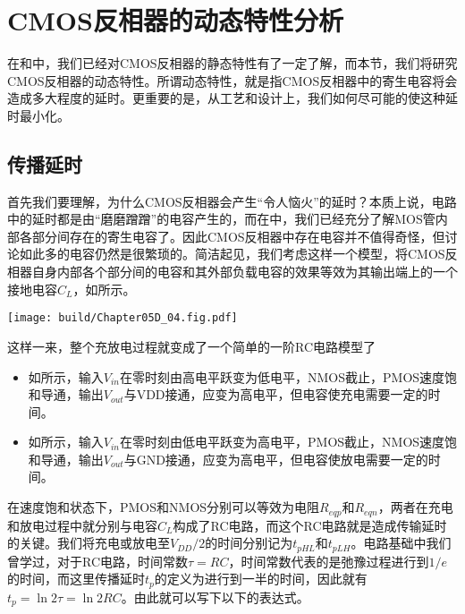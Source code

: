 \section{CMOS反相器的动态特性分析}

在和中，我们已经对CMOS反相器的静态特性有了一定了解，而本节，我们将研究CMOS反相器的动态特性。所谓动态特性，就是指CMOS反相器中的寄生电容将会造成多大程度的延时。更重要的是，从工艺和设计上，我们如何尽可能的使这种延时最小化。

\subsection{传播延时}
首先我们要理解，为什么CMOS反相器会产生“令人恼火”的延时？本质上说，电路中的延时都是由“磨磨蹭蹭”的电容产生的，而在中，我们已经充分了解MOS管内部各部分间存在的寄生电容了。因此CMOS反相器中存在电容并不值得奇怪，但讨论如此多的电容仍然是很繁琐的。简洁起见，我们考虑这样一个模型，将CMOS反相器自身内部各个部分间的电容和其外部负载电容的效果等效为其输出端上的一个接地电容$C_L$，如所示。

\begin{Figure}[CMOS反相器的输出接地电容]
    \texttt{[image: build/Chapter05D\_04.fig.pdf]}
\end{Figure}

这样一来，整个充放电过程就变成了一个简单的一阶RC电路模型了
\begin{itemize}
    \item 如\hspace{0.2em}所示，输入$V_{in}$在零时刻由高电平跃变为低电平，NMOS截止，PMOS速度饱和导通，输出$V_{out}$与VDD接通，应变为高电平，但电容使充电需要一定的时间。
    \item 如所示，输入$V_{in}$在零时刻由低电平跃变为高电平，PMOS截止，NMOS速度饱和导通，输出$V_{out}$与GND接通，应变为高电平，但电容使放电需要一定的时间。
\end{itemize}
在速度饱和状态下，PMOS和NMOS分别可以等效为电阻$R_{eqp}$和$R_{eqn}$，两者在充电和放电过程中就分别与电容$C_L$构成了RC电路，而这个RC电路就是造成传输延时的关键。我们将充电或放电至$V_{DD}/2$的时间分别记为$t_\textit{pHL}$和$t_\textit{pLH}$。电路基础中我们曾学过，对于RC电路，时间常数$\tau=RC$，时间常数代表的是弛豫过程进行到$1/e$的时间，而这里传播延时$t_p$的定义为进行到一半的时间，因此就有$t_p=\ln 2\tau=\ln 2RC$。由此就可以写下以下的表达式。

